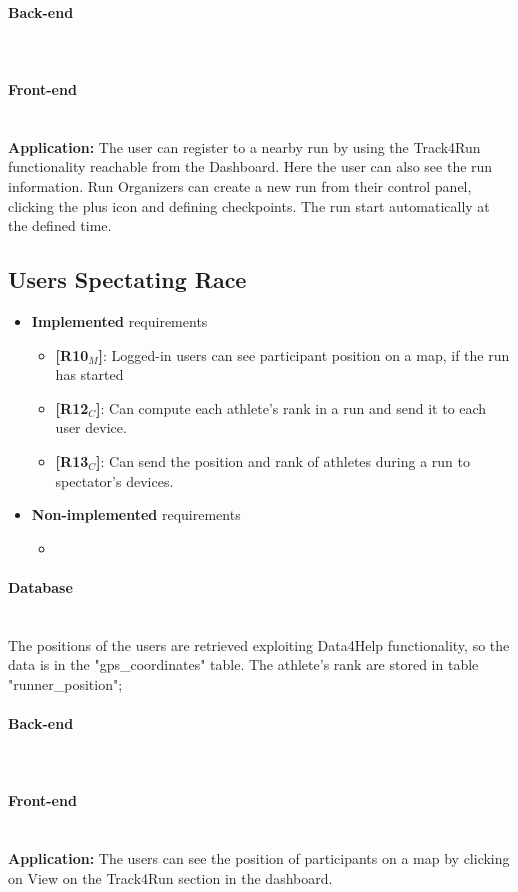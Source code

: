 \paragraph{Back-end} \mbox{}\\
\paragraph{Front-end} \mbox{}\\
\textbf{Application:} The user can register to a nearby run by using the Track4Run functionality reachable from the Dashboard. Here the user can also see the run information. Run Organizers can create a new run from their control panel, clicking the plus icon and defining checkpoints. The run start automatically at the defined time.

\subsection{Users Spectating Race}
\begin{itemize}
    \item \textbf{Implemented} requirements
        \begin{itemize}
        
        
        \item \textbf{[R10$_M$]}: Logged-in users can see participant position on a map, if the run has started


    \item \textbf{[R12$_C$]}: Can compute each athlete's rank in a run and send it to each user device.
    \item \textbf{[R13$_C$]}: Can send the position and rank of athletes during a run to spectator's devices.


        \end{itemize}
    \item \textbf{Non-implemented} requirements
    \begin{itemize}
            \item 
        \end{itemize}
\end{itemize}

\paragraph{Database} \mbox{}\\
The positions of the users are retrieved exploiting Data4Help functionality, so the data is in the "gps\_coordinates" table. The athlete's rank are stored in table "runner\_position";
\paragraph{Back-end} \mbox{}\\
\paragraph{Front-end} \mbox{}\\
\textbf{Application:} The users can see the position of participants on a map by clicking on View on the Track4Run section in the dashboard.
